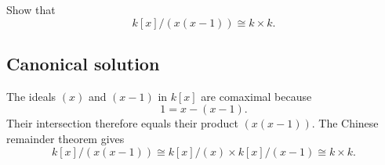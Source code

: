 
\begin{exercise}
	Show that
	\[
	k[x]/(x(x-1))\cong k\times k.
	\]
\end{exercise}

\subsection*{Canonical solution}
The ideals $(x)$ and $(x-1)$ in $k[x]$ are comaximal because
\[
1=x-(x-1).
\]
Their intersection therefore equals their product $(x(x-1))$. The Chinese remainder theorem gives
\[
k[x]/(x(x-1))\cong k[x]/(x)\times k[x]/(x-1)\cong k\times k.
\]

